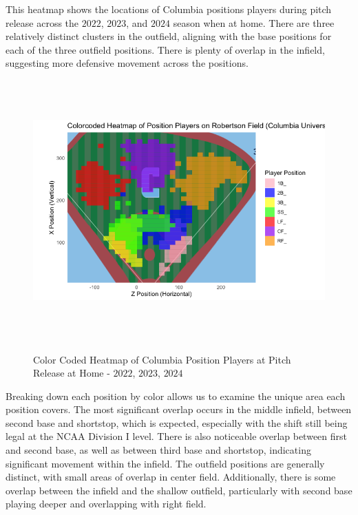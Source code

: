 \documentclass{article}
\begin{document}
\newpage

This heatmap shows the locations of Columbia positions players during pitch release across the $2022$, $2023$, and $2024$ season when at home. There are three relatively distinct clusters in the outfield, aligning with the base positions for each of the three outfield positions. There is plenty of overlap in the infield, suggesting more defensive movement across the positions. 

\vspace{1cm}
\begin{figure}[h]
    \centering        
    \includegraphics[height=10cm]{images/colorcoded_pos_heatmap.png}
    \caption{Color Coded Heatmap of Columbia Position Players at Pitch Release at Home - $2022$, $2023$, $2024$}
    \cite{trackman2022} \cite{trackman2023} \cite{trackman2024} \cite{albert2023analyzing}
\end{figure}
\vspace{1cm}
\newpage

Breaking down each position by color allows us to examine the unique area each position covers. The most significant overlap occurs in the middle infield, between second base and shortstop, which is expected, especially with the shift still being legal at the NCAA Division I level. There is also noticeable overlap between first and second base, as well as between third base and shortstop, indicating significant movement within the infield. The outfield positions are generally distinct, with small areas of overlap in center field. Additionally, there is some overlap between the infield and the shallow outfield, particularly with second base playing deeper and overlapping with right field.
\end{document}
